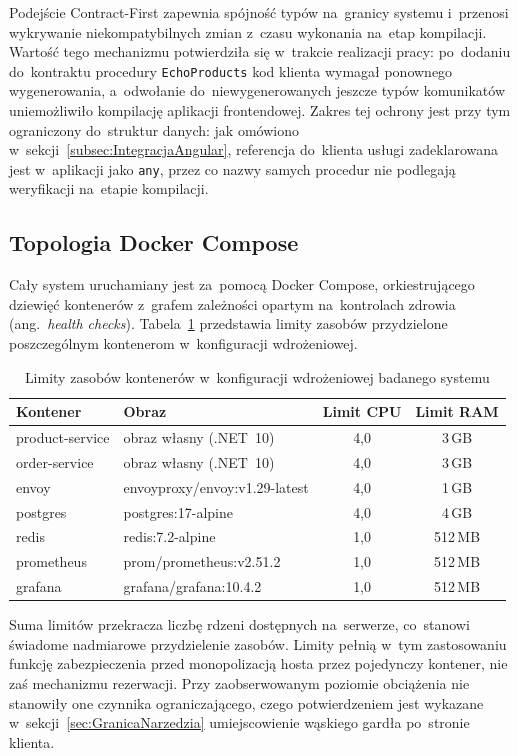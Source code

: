 Podejście Contract-First zapewnia spójność typów na~granicy systemu i~przenosi wykrywanie niekompatybilnych zmian z~czasu wykonania na~etap kompilacji. Wartość tego mechanizmu potwierdziła się w~trakcie realizacji pracy: po~dodaniu do~kontraktu procedury \texttt{EchoProducts} kod klienta wymagał ponownego wygenerowania, a~odwołanie do~niewygenerowanych jeszcze typów komunikatów uniemożliwiło kompilację aplikacji frontendowej. Zakres tej ochrony jest przy tym ograniczony do~struktur danych: jak omówiono w~sekcji~\ref{subsec:IntegracjaAngular}, referencja do~klienta usługi zadeklarowana jest w~aplikacji jako \texttt{any}, przez co nazwy samych procedur nie podlegają weryfikacji na~etapie kompilacji.

\subsection{Topologia Docker Compose}
\label{subsec:DockerCompose}

Cały system uruchamiany jest za~pomocą Docker Compose, orkiestrującego dziewięć kontenerów z~grafem zależności opartym na~kontrolach zdrowia (ang.\ \textit{health checks}). Tabela~\ref{tab:DockerServices} przedstawia limity zasobów przydzielone poszczególnym kontenerom w~konfiguracji wdrożeniowej.

\begin{table}[htb]
\centering
\footnotesize
\caption{Limity zasobów kontenerów w~konfiguracji wdrożeniowej badanego systemu}
\label{tab:DockerServices}
\begin{tabular}{|l|l|c|c|}
\hline
\textbf{Kontener} & \textbf{Obraz} & \textbf{Limit CPU} & \textbf{Limit RAM} \\
\hline
product-service & obraz własny (.NET~10) & 4,0 & 3\,GB \\
order-service   & obraz własny (.NET~10) & 4,0 & 3\,GB \\
envoy           & envoyproxy/envoy:v1.29-latest & 4,0 & 1\,GB \\
postgres        & postgres:17-alpine & 4,0 & 4\,GB \\
redis           & redis:7.2-alpine & 1,0 & 512\,MB \\
prometheus      & prom/prometheus:v2.51.2 & 1,0 & 512\,MB \\
grafana         & grafana/grafana:10.4.2 & 1,0 & 512\,MB \\
\hline
\end{tabular}
\end{table}

Suma limitów przekracza liczbę rdzeni dostępnych na~serwerze, co~stanowi świadome nadmiarowe przydzielenie zasobów. Limity pełnią w~tym zastosowaniu funkcję zabezpieczenia przed monopolizacją hosta przez pojedynczy kontener, nie zaś mechanizmu rezerwacji. Przy zaobserwowanym poziomie obciążenia nie stanowiły one czynnika ograniczającego, czego potwierdzeniem jest wykazane w~sekcji~\ref{sec:GranicaNarzedzia} umiejscowienie wąskiego gardła po~stronie klienta.

